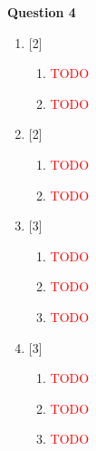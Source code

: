 \noindent
\textbf{Question 4}
\begin{enumerate}[label=(\roman*)]

    \item \hfill [2]
        \begin{enumerate}[label=(\alph*)]
            \item \textcolor{red}{TODO}
            \item \textcolor{red}{TODO}
        \end{enumerate}

    \item \hfill [2]
        \begin{enumerate}[label=(\alph*)]
            \item \textcolor{red}{TODO}
            \item \textcolor{red}{TODO}
        \end{enumerate}

    \item \hfill [3]
        \begin{enumerate}[label=(\alph*)]
            \item \textcolor{red}{TODO}
            \item \textcolor{red}{TODO}
            \item \textcolor{red}{TODO}
        \end{enumerate}

    \item \hfill [3]
        \begin{enumerate}[label=(\alph*)]
            \item \textcolor{red}{TODO}
            \item \textcolor{red}{TODO}
            \item \textcolor{red}{TODO}
        \end{enumerate}

\end{enumerate}

